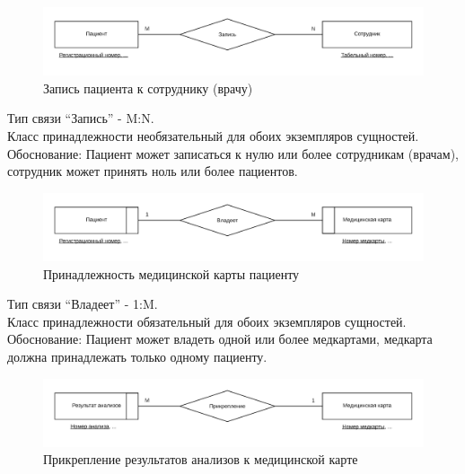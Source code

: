 \documentclass[14pt,a4paper,russian]{extreport}
\begin{document}
\begin{figure}[h!]
        \includegraphics[width=\textwidth]{patappemp}
        \caption{Запись пациента к сотруднику (врачу)}
        \label{fig:patappemp}
\end{figure}

\noindent Тип связи ``Запись'' - M:N.\\
Класс принадлежности необязательный для обоих экземпляров сущностей.
Обоснование: Пациент может записаться к нулю или более сотрудникам (врачам), сотрудник может принять ноль или более
пациентов. \par
\noindent\hrulefill\par

\begin{figure}[h!]
        \includegraphics[width=\textwidth]{medcbelpat}
        \caption{Принадлежность медицинской карты пациенту}
        \label{fig:medcbelpat}
\end{figure}

\noindent Тип связи ``Владеет'' - 1:M.\\
Класс принадлежности обязательный для обоих экземпляров сущностей.\\
Обоснование: Пациент может владеть одной или более медкартами, медкарта должна принадлежать
только одному пациенту.\par
\noindent\hrulefill\par

\begin{figure}[h!]
        \includegraphics[width=\textwidth]{cardan}
        \caption{Прикрепление результатов анализов к медицинской карте}
        \label{fig:cardan}
\end{figure}
\end{document}

